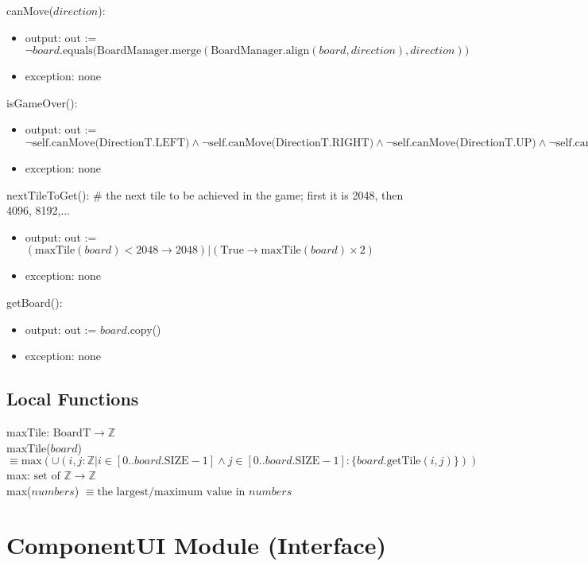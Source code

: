 \documentclass[12pt]{article}
\begin{document}
\noindent canMove($direction$):
\begin{itemize}
\item output: out := $\lnot board.\text{equals(BoardManager.merge}(\text{BoardManager.align}(board, direction),direction))$
\item exception: none
\end{itemize}

\noindent isGameOver():
\begin{itemize}
\item output: out := $\lnot \text{self.canMove(DirectionT.LEFT)} \wedge \lnot \text{self.canMove(DirectionT.RIGHT)} \wedge \lnot \text{self.canMove(DirectionT.UP)} \wedge \lnot \text{self.canMove(DirectionT.DOWN)}$
\item exception: none
\end{itemize}

\noindent nextTileToGet(): \# the next tile to be achieved in the game; first it is 2048, then 4096, 8192,...
\begin{itemize}
\item output: out := $(\text{maxTile}(board) < 2048 \rightarrow 2048)|(\text{True} \rightarrow \text{maxTile}(board) \times 2)$
\item exception: none
\end{itemize}

\noindent getBoard():
\begin{itemize}
\item output: out := $board$.copy()
\item exception: none
\end{itemize}

\subsection* {Local Functions}
\noindent maxTile: $\text{BoardT} \rightarrow \mathbb{Z}$ \\
\noindent maxTile($board$) $\equiv \text{max}(\cup(i, j:\mathbb{Z} | i \in [0..board.\text{SIZE}-1] \wedge j \in [0..board.\text{SIZE}-1]:\{board.\text{getTile}(i, j)\}))$ \\

\noindent max: $\text{set of } \mathbb{Z} \rightarrow \mathbb{Z}$ \\
\noindent max($numbers$) $\equiv \text{the largest/maximum value in } numbers$ \\

\newpage

\section* {ComponentUI Module (Interface)}
\end{document}
